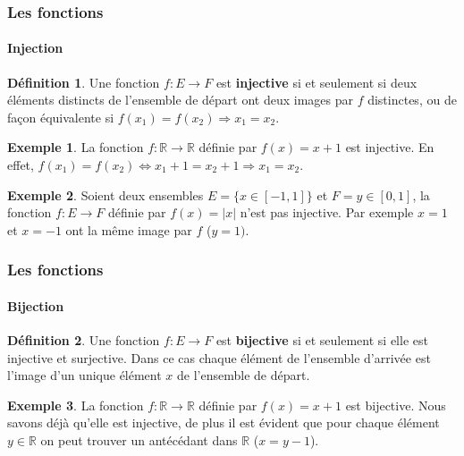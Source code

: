 \documentclass[10pt,notheorems]{beamer}
\theoremstyle{plain}
\theoremstyle{definition} %
\newtheorem{definition}{Définition}
\newtheorem{example}{Exemple}
\begin{document}
\begin{frame}
  \frametitle{Les fonctions}
  \framesubtitle{Injection}
  \hypertarget{slide_fonctions_injection}{}

  \begin{definition}\label{def:injection} Une fonction $f: E\longrightarrow F$ est \textbf{injective} si et seulement si deux éléments distincts de l'ensemble de départ ont deux images par $f$ distinctes, ou de façon équivalente si $f(x_1)= f(x_2) \Rightarrow x_1=x_2$.
  \end{definition}

  \begin{example}\label{ex:injection_1}
    La fonction $f: \mathbb R\longrightarrow \mathbb R$ définie par $f(x) = x+1$ est injective. En effet, $f(x_1)=f(x_2)\Leftrightarrow x_1+1 = x_2+1 \Rightarrow x_1 = x_2$.
  \end{example}

  \begin{example}\label{ex:injection_2}
    Soient deux ensembles $E = \{x\in [-1,1]\}$ et $F = {y\in[0,1]}$, la fonction $f: E\longrightarrow F$ définie par $f(x) = |x|$ n'est pas injective. Par exemple $x=1$ et $x=-1$ ont la même image par $f$ ($y=1)$.
  \end{example}

\end{frame}


\begin{frame}
  \frametitle{Les fonctions}
  \framesubtitle{Bijection}
  \hypertarget{slide_fonctions_bijection}{}

  \begin{definition}\label{def:bijection} Une fonction $f: E\longrightarrow F$ est \textbf{bijective} si et seulement si elle est injective et surjective. Dans ce cas chaque élément de l'ensemble d'arrivée est l'image d'un unique élément $x$ de l'ensemble de départ.
  \end{definition}

  \bigskip

  \begin{example}\label{ex:bijection_1}
    La fonction $f: \mathbb R\longrightarrow \mathbb R$ définie par $f(x) = x+1$ est bijective. Nous savons déjà qu'elle est injective, de plus il est évident que pour chaque élément $y\in\mathbb R$ on peut trouver un antécédant dans $\mathbb R$ ($x = y-1$).
  \end{example}

\end{frame}
\end{document}
